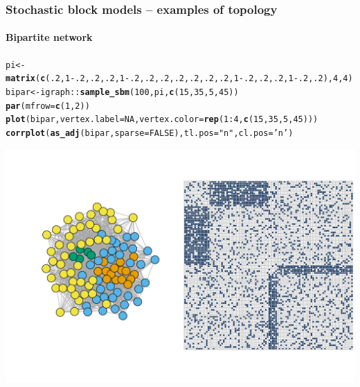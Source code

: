 \documentclass{beamer}\usepackage[]{graphicx}\usepackage[]{color}
\makeatletter
\newcommand{\hlnum}[1]{\textcolor[rgb]{0.686,0.059,0.569}{#1}}%
\newcommand{\hlstr}[1]{\textcolor[rgb]{0.192,0.494,0.8}{#1}}%
\newcommand{\hlopt}[1]{\textcolor[rgb]{0,0,0}{#1}}%
\newcommand{\hlstd}[1]{\textcolor[rgb]{0.345,0.345,0.345}{#1}}%
\newcommand{\hlkwb}[1]{\textcolor[rgb]{0.69,0.353,0.396}{#1}}%
\newcommand{\hlkwc}[1]{\textcolor[rgb]{0.333,0.667,0.333}{#1}}%
\newcommand{\hlkwd}[1]{\textcolor[rgb]{0.737,0.353,0.396}{\textbf{#1}}}%
\newenvironment{kframe}{%
 \def\at@end@of@kframe{}%
 \ifinner\ifhmode%
  \def\at@end@of@kframe{\end{minipage}}%
  \begin{minipage}{\columnwidth}%
 \fi\fi%
 \def\FrameCommand##1{\hskip\@totalleftmargin \hskip-\fboxsep
 \colorbox{shadecolor}{##1}\hskip-\fboxsep
     \hskip-\linewidth \hskip-\@totalleftmargin \hskip\columnwidth}%
 \MakeFramed {\advance\hsize-\width
   \@totalleftmargin\z@ \linewidth\hsize
   \@setminipage}}%
 {\par\unskip\endMakeFramed%
 \at@end@of@kframe}
\newenvironment{knitrout}{}{} %
\makeatother
\begin{document}
\begin{frame}[fragile]
  \frametitle{Stochastic block models -- examples of topology}
  \framesubtitle{Bipartite network}

\begin{knitrout}\scriptsize
{}\color{fgcolor}\begin{kframe}
\begin{alltt}
\hlstd{pi} \hlkwb{<-} \hlkwd{matrix}\hlstd{(}\hlkwd{c}\hlstd{(}\hlnum{.2}\hlstd{,}\hlnum{1}\hlopt{-}\hlnum{.2}\hlstd{,}\hlnum{.2}\hlstd{,}\hlnum{.2}\hlstd{,}\hlnum{1}\hlopt{-}\hlnum{.2}\hlstd{,}\hlnum{.2}\hlstd{,}\hlnum{.2}\hlstd{,}\hlnum{.2}\hlstd{,}\hlnum{.2}\hlstd{,}\hlnum{.2}\hlstd{,} \hlnum{.2}\hlstd{,}\hlnum{1}\hlopt{-}\hlnum{.2}\hlstd{,}\hlnum{.2}\hlstd{,}\hlnum{.2}\hlstd{,}\hlnum{1}\hlopt{-}\hlnum{.2}\hlstd{,}\hlnum{.2}\hlstd{),}\hlnum{4}\hlstd{,}\hlnum{4}\hlstd{)}
\hlstd{bipar} \hlkwb{<-} \hlstd{igraph}\hlopt{::}\hlkwd{sample_sbm}\hlstd{(}\hlnum{100}\hlstd{, pi,} \hlkwd{c}\hlstd{(}\hlnum{15}\hlstd{,} \hlnum{35}\hlstd{,} \hlnum{5}\hlstd{,} \hlnum{45}\hlstd{))}
\hlkwd{par}\hlstd{(}\hlkwc{mfrow} \hlstd{=} \hlkwd{c}\hlstd{(}\hlnum{1}\hlstd{,}\hlnum{2}\hlstd{))}
\hlkwd{plot}\hlstd{(bipar,} \hlkwc{vertex.label}\hlstd{=}\hlnum{NA}\hlstd{,} \hlkwc{vertex.color} \hlstd{=} \hlkwd{rep}\hlstd{(}\hlnum{1}\hlopt{:}\hlnum{4}\hlstd{,}\hlkwd{c}\hlstd{(}\hlnum{15}\hlstd{,} \hlnum{35}\hlstd{,} \hlnum{5}\hlstd{,} \hlnum{45}\hlstd{)))}
\hlkwd{corrplot}\hlstd{(}\hlkwd{as_adj}\hlstd{(bipar,} \hlkwc{sparse} \hlstd{=}\hlnum{FALSE}\hlstd{),} \hlkwc{tl.pos} \hlstd{=} \hlstr{"n"}\hlstd{,} \hlkwc{cl.pos} \hlstd{=} \hlstr{'n'}\hlstd{)}
\end{alltt}
\end{kframe}
\includegraphics[width=.8\textwidth]{figures/unnamed-chunk-10-1} 
\end{knitrout}

\end{frame}
\end{document}

